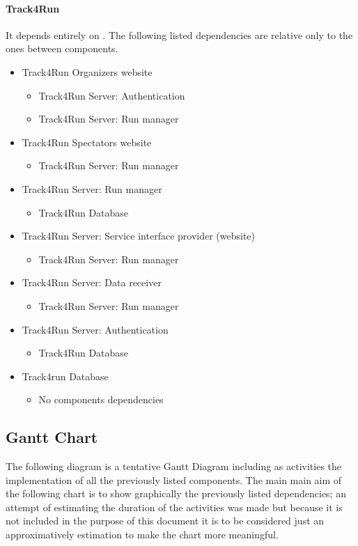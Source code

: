 		\paragraph{Track4Run}
		It depends entirely on . The following listed dependencies are relative only to the ones between  components.
		\begin{itemize}
			\item{Track4Run Organizers website}
			\begin{itemize}\item{Track4Run Server: Authentication}\item{Track4Run Server: Run manager}\end{itemize}
			\item{Track4Run Spectators website}
			\begin{itemize}\item{Track4Run Server: Run manager}\end{itemize}
			\item{Track4Run Server: Run manager}
			\begin{itemize}\item{Track4Run Database}\end{itemize}
			\item{Track4Run Server: Service interface provider (website)}
			\begin{itemize}\item{Track4Run Server: Run manager}\end{itemize}
			\item{Track4Run Server: Data receiver}
			\begin{itemize}\item{Track4Run Server: Run manager}\end{itemize}
			\item{Track4Run Server: Authentication}
			\begin{itemize}\item{Track4Run Database}\end{itemize}
			\item{Track4run Database}
			\begin{itemize}\item{No components dependencies}\end{itemize}
		\end{itemize}
	\subsection{Gantt Chart}
	The following diagram is a tentative Gantt Diagram including as activities the implementation of all the previously listed components. The main main aim of the following chart is to show graphically the previously listed dependencies; an attempt of estimating the duration of the activities was made but because it is not included in the purpose of this document it is to be considered just an approximatively estimation to make the chart more meaningful.
	\\
	\\

